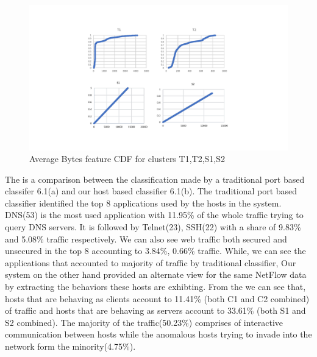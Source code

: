 \begin{figure}[t]
	\centerline{\includegraphics[trim=2cm 2cm 2cm 2cm, scale = 0.7]{bytes_cdf.pdf}}
	\caption{ Average Bytes feature CDF for clusters T1,T2,S1,S2}%
\end{figure}




The  is a comparison between the classification made by a traditional port based classifer 6.1(a) and our host based classifier 6.1(b). The traditional port based classifier identified the top 8 applications used by the hosts in the system. DNS(53) is the most used application with 11.95\% of the whole traffic trying to query DNS servers. It is followed by Telnet(23), SSH(22) with a share of 9.83\% and 5.08\% traffic respectively. We can also see web traffic both secured and unsecured in the top 8 accounting to 3.84\%, 0.66\% traffic. While, we can see the applications that accounted to majority of traffic by traditional classifier, Our system on the other hand provided an alternate view for the same NetFlow data by extracting the behaviors these hosts are exhibting. From the  we can see that, hosts that are behaving as clients account to 11.41\% (both C1 and C2 combined) of traffic and hosts that are behaving as servers account to 33.61\% (both S1 and S2 combined). The majority of the traffic(50.23\%) comprises of interactive communication between hosts while the anomalous hosts trying to invade into the network form the minority(4.75\%). 

